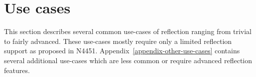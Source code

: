 \section{Use cases}
\label{section-use-cases}

This section describes several common use-cases of reflection ranging from trivial to fairly advanced.
These use-cases mostly require only a limited reflection support as proposed in N4451.
Appendix~\ref{appendix-other-use-cases} contains
several additional use-cases which are less common or require advanced reflection features.







